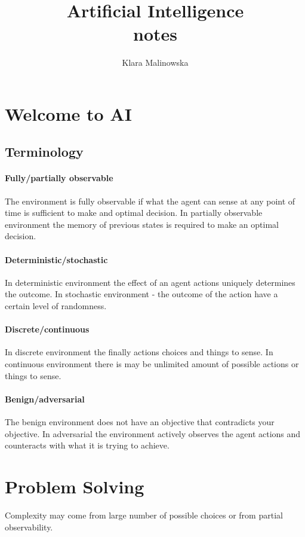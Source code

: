 \documentclass[a4paper,10pt]{article}
\title{Artificial Intelligence \\ notes}
\author{Klara Malinowska}
\begin{document}
\maketitle
\section{Welcome to AI}
\subsection{Terminology}

\paragraph{Fully/partially observable}
The environment is fully observable if what the agent can sense at any point of time is sufficient to make and optimal decision. In partially observable environment the memory of previous states is required to make an optimal decision.

\paragraph{Deterministic/stochastic}
In deterministic environment the effect of an agent actions uniquely determines the outcome. In stochastic environment - the outcome of the action have a certain level of randomness.

\paragraph{Discrete/continuous}
In discrete environment the finally actions choices and things to sense. In continuous environment there is may be unlimited amount of possible actions or things to sense.

\paragraph{Benign/adversarial}
The benign environment does not have an objective that contradicts your objective. In adversarial the environment actively observes the agent actions and counteracts with what it is trying to achieve.

\section{Problem Solving}

Complexity may come from large number of possible choices or from partial observability.
\end{document}
